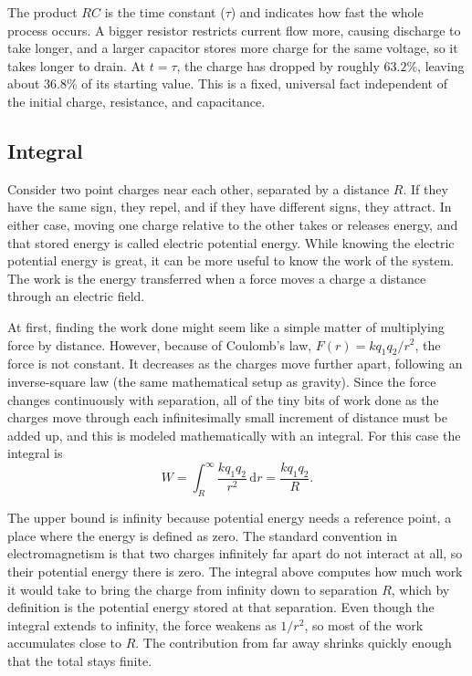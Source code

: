 \documentclass[11pt]{article}
\newcommand{\dd}{\mathrm{d}}
\begin{document}
The product $RC$ is the time constant ($\tau$) and indicates how fast the whole process occurs. A bigger resistor restricts current flow more, causing discharge to take longer, and a larger capacitor stores more charge for the same voltage, so it takes longer to drain. At $t = \tau$, the charge has dropped by roughly $63.2\%$, leaving about $36.8\%$ of its starting value. This is a fixed, universal fact independent of the initial charge, resistance, and capacitance.

\subsection{Integral}

Consider two point charges near each other, separated by a distance $R$. If they have the same sign, they repel, and if they have different signs, they attract. In either case, moving one charge relative to the other takes or releases energy, and that stored energy is called electric potential energy. While knowing the electric potential energy is great, it can be more useful to know the work of the system. The work is the energy transferred when a force moves a charge a distance through an electric field.

At first, finding the work done might seem like a simple matter of multiplying force by distance. However, because of Coulomb's law, $F(r) = kq_1q_2/r^2$, the force is not constant. It decreases as the charges move further apart, following an inverse-square law (the same mathematical setup as gravity). Since the force changes continuously with separation, all of the tiny bits of work done as the charges move through each infinitesimally small increment of distance must be added up, and this is modeled mathematically with an integral. For this case the integral is
\begin{equation}
  W = \int_R^{\infty} \frac{k q_1 q_2}{r^2}\,\dd r = \frac{k q_1 q_2}{R}.
\end{equation}

The upper bound is infinity because potential energy needs a reference point, a place where the energy is defined as zero. The standard convention in electromagnetism is that two charges infinitely far apart do not interact at all, so their potential energy there is zero. The integral above computes how much work it would take to bring the charge from infinity down to separation $R$, which by definition is the potential energy stored at that separation. Even though the integral extends to infinity, the force weakens as $1/r^2$, so most of the work accumulates close to $R$. The contribution from far away shrinks quickly enough that the total stays finite.
\end{document}
